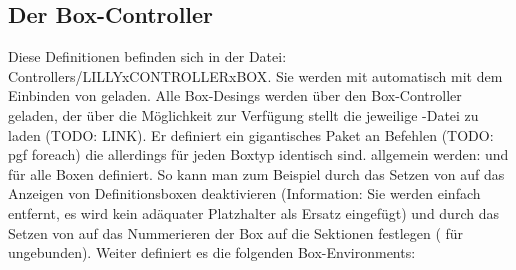 \subsection{Der Box-Controller}
Diese Definitionen befinden sich in der Datei: {\ltt Controllers/LILLYxCONTROLLERxBOX}. Sie werden mit  automatisch mit dem Einbinden von\newline {} geladen.\medskip\newline
Alle Box-Desings werden über den Box-Controller geladen, der über  die Möglichkeit zur Verfügung stellt die jeweilige -Datei zu laden (TODO: LINK). Er definiert ein gigantisches Paket an Befehlen (TODO: pgf foreach) die allerdings für jeden Boxtyp identisch sind. allgemein werden:  und  für alle Boxen definiert. So kann man zum Beispiel durch das Setzen von  auf  das Anzeigen von Definitionsboxen deaktivieren (Information: Sie werden einfach entfernt, es wird kein adäquater Platzhalter als Ersatz eingefügt) und durch das Setzen von  auf das Nummerieren der Box auf die Sektionen festlegen ( für ungebunden).
Weiter definiert es die folgenden Box-Environments:
%

